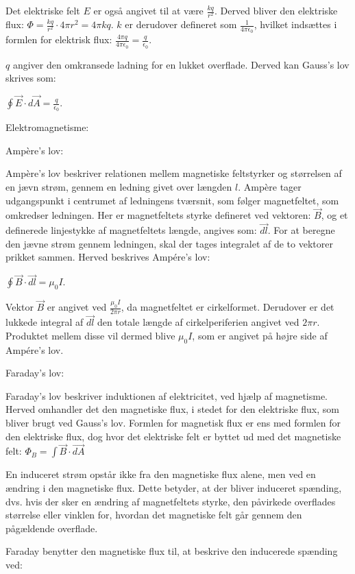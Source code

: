 Det elektriske felt $E$ er også angivet til at være $\frac{kq}{r^2}$. Derved bliver den elektriske flux: $\Phi = \frac{kq}{r^2} \cdot 4 \pi r^2 = 4 \pi k q$. $k$ er derudover defineret som $\frac{1}{4 \pi \epsilon_0}$, hvilket indsættes i formlen for elektrisk flux: $\frac{4 \pi q}{4 \pi \epsilon_0} = \frac{q}{\epsilon_0}$.

$q$ angiver den omkransede ladning for en lukket overflade. Derved kan Gauss's lov skrives som:

\centerline{$\oint \vec{E} \cdot d \vec{A} = \frac{q}{\epsilon_0}$. \citep{gauss}}

Elektromagnetisme:

Ampère's lov:

Ampère's lov beskriver relationen mellem magnetiske feltstyrker og størrelsen af en jævn strøm, gennem en ledning givet over længden $l$. Ampère tager udgangspunkt i centrumet af ledningens tværsnit, som følger magnetfeltet, som omkredser ledningen. Her er magnetfeltets styrke defineret ved vektoren: $\vec{B}$, og et definerede linjestykke af magnetfeltets længde, angives som: $\vec{dl}$. For at beregne den jævne strøm gennem ledningen, skal der tages integralet af de to vektorer prikket sammen. Herved beskrives Ampére's lov:

\centerline{$\oint \vec{B} \cdot \vec{dl} = \mu_0 I$. \citep{ampere}}

Vektor $\vec{B}$ er angivet ved $\frac{\mu_0 I}{2 \pi r}$, da magnetfeltet er cirkelformet. Derudover er det lukkede integral af $\vec{dl}$ den totale længde af cirkelperiferien angivet ved $2 \pi r$. Produktet mellem disse vil dermed blive $\mu_0 I$, som er angivet på højre side af Ampére's lov.

Faraday's lov:

Faraday's lov beskriver induktionen af elektricitet, ved hjælp af magnetisme. Herved omhandler det den magnetiske flux, i stedet for den elektriske flux, som bliver brugt ved Gauss's lov. Formlen for magnetisk flux er ens med formlen for den elektriske flux, dog hvor det elektriske felt er byttet ud med det magnetiske felt: $\Phi_B = \int \vec{B} \cdot \vec{dA}$

En induceret strøm opstår ikke fra den magnetiske flux alene, men ved en ændring i den magnetiske flux. Dette betyder, at der bliver induceret spænding, dvs. hvis der sker en ændring af magnetfeltets styrke, den påvirkede overflades størrelse eller vinklen for, hvordan det magnetiske felt går gennem den pågældende overflade.

Faraday benytter den magnetiske flux til, at beskrive den inducerede spænding ved:

